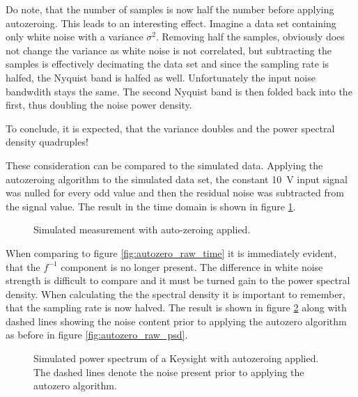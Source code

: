 Do note, that the number of samples is now half the number before applying autozeroing. This leads to an interesting effect. Imagine a data set containing only white noise with a variance $\sigma^2$. Removing half the samples, obviously does not change the variance as white noise is not correlated, but subtracting the samples is effectively decimating the data set and since the sampling rate is halfed, the Nyquist band is halfed as well. Unfortunately the input noise bandwdith stays the same. The second Nyquist band is then folded back into the first, thus doubling the noise power density.

To conclude, it is expected, that the variance doubles and the power spectral density quadruples!

These consideration can be compared to the simulated data. Applying the autozeroing algorithm to the simulated data set, the constant \qty{10}{\V} input signal was nulled for every odd value and then the residual noise was subtracted from the signal value. The result in the time domain is shown in figure \ref{fig:autozero_time}.

\begin{figure}[hb]
    \centering
    
    \caption{Simulated measurement with auto-zeroing applied.}
    \label{fig:autozero_time}
\end{figure}

When comparing to figure \ref{fig:autozero_raw_time} it is immediately evident, that the $f^{-1}$ component is no longer present. The difference in white noise strength is difficult to compare and it must be turned gain to the power spectral density. When calculating the the spectral density it is important to remember, that the sampling rate is now halved. The result is shown in figure \ref{fig:autozero_psd} along with dashed lines showing the noise content prior to applying the autozero algorithm as before in figure \ref{fig:autozero_raw_psd}.

\begin{figure}[ht]
    \centering
    
    \caption{Simulated power spectrum of a Keysight  with autozeroing applied. The dashed lines denote the noise present prior to applying the autozero algorithm.}
    \label{fig:autozero_psd}
\end{figure}

